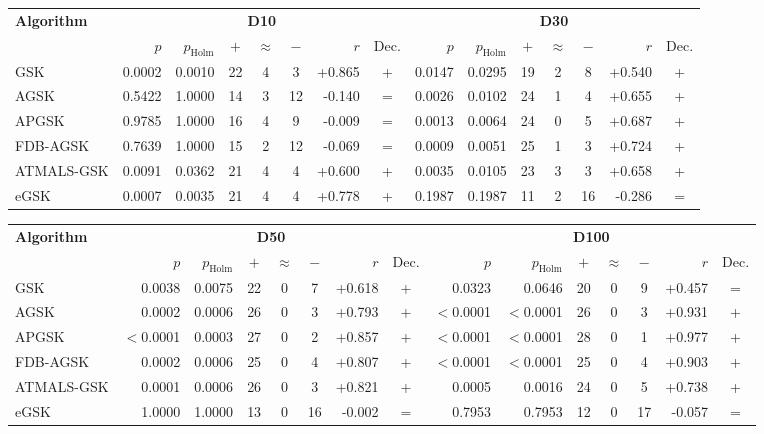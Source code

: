 \zebra
\begin{tabular}{lrrcccrcrrcccrc}
\toprule
\textbf{Algorithm} & \multicolumn{7}{c}{\textbf{D10}} & \multicolumn{7}{c}{\textbf{D30}} \\
 & $p$ & $p_{\mathrm{Holm}}$ & $+$ & $\approx$ & $-$ & $r$ & Dec. & $p$ & $p_{\mathrm{Holm}}$ & $+$ & $\approx$ & $-$ & $r$ & Dec. \\
\midrule
GSK & 0.0002 & 0.0010 & 22 & 4 & 3 & +0.865 & + & 0.0147 & 0.0295 & 19 & 2 & 8 & +0.540 & + \\
AGSK & 0.5422 & 1.0000 & 14 & 3 & 12 & -0.140 & = & 0.0026 & 0.0102 & 24 & 1 & 4 & +0.655 & + \\
APGSK & 0.9785 & 1.0000 & 16 & 4 & 9 & -0.009 & = & 0.0013 & 0.0064 & 24 & 0 & 5 & +0.687 & + \\
FDB-AGSK & 0.7639 & 1.0000 & 15 & 2 & 12 & -0.069 & = & 0.0009 & 0.0051 & 25 & 1 & 3 & +0.724 & + \\
ATMALS-GSK & 0.0091 & 0.0362 & 21 & 4 & 4 & +0.600 & + & 0.0035 & 0.0105 & 23 & 3 & 3 & +0.658 & + \\
eGSK & 0.0007 & 0.0035 & 21 & 4 & 4 & +0.778 & + & 0.1987 & 0.1987 & 11 & 2 & 16 & -0.286 & = \\
\bottomrule
\end{tabular}

\vspace{6pt}

\zebra
\begin{tabular}{lrrcccrcrrcccrc}
\toprule
\textbf{Algorithm} & \multicolumn{7}{c}{\textbf{D50}} & \multicolumn{7}{c}{\textbf{D100}} \\
 & $p$ & $p_{\mathrm{Holm}}$ & $+$ & $\approx$ & $-$ & $r$ & Dec. & $p$ & $p_{\mathrm{Holm}}$ & $+$ & $\approx$ & $-$ & $r$ & Dec. \\
\midrule
GSK & 0.0038 & 0.0075 & 22 & 0 & 7 & +0.618 & + & 0.0323 & 0.0646 & 20 & 0 & 9 & +0.457 & = \\
AGSK & 0.0002 & 0.0006 & 26 & 0 & 3 & +0.793 & + & $<$0.0001 & $<$0.0001 & 26 & 0 & 3 & +0.931 & + \\
APGSK & $<$0.0001 & 0.0003 & 27 & 0 & 2 & +0.857 & + & $<$0.0001 & $<$0.0001 & 28 & 0 & 1 & +0.977 & + \\
FDB-AGSK & 0.0002 & 0.0006 & 25 & 0 & 4 & +0.807 & + & $<$0.0001 & $<$0.0001 & 25 & 0 & 4 & +0.903 & + \\
ATMALS-GSK & 0.0001 & 0.0006 & 26 & 0 & 3 & +0.821 & + & 0.0005 & 0.0016 & 24 & 0 & 5 & +0.738 & + \\
eGSK & 1.0000 & 1.0000 & 13 & 0 & 16 & -0.002 & = & 0.7953 & 0.7953 & 12 & 0 & 17 & -0.057 & = \\
\bottomrule
\end{tabular}
